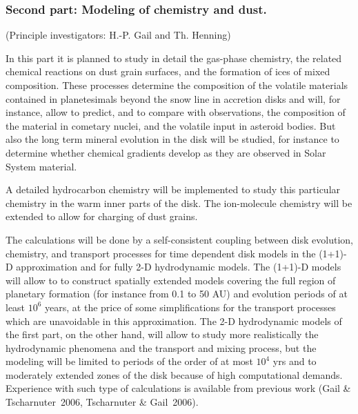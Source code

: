 \subsubsection{Second part: Modeling of chemistry and dust.}
(Principle investigators: H.-P. Gail and Th. Henning)

\noindent In this part it is planned to study in detail the gas-phase
chemistry, the related chemical reactions on dust grain surfaces,
and the formation of ices of mixed composition. These processes
determine the composition of the volatile materials contained in
planetesimals beyond the snow line in accretion disks and will,
for instance, allow to predict, and to compare with observations,
the composition of the material in cometary nuclei, and the
volatile input in asteroid bodies. But also the long term mineral
evolution in the disk will be studied, for instance to determine
whether chemical gradients develop as they are observed in Solar
System material.

A detailed hydrocarbon chemistry will be implemented to study this
particular chemistry in the warm inner parts of the disk. The
ion-molecule chemistry will be extended to allow for charging of
dust grains.

The calculations will be done by a self-consistent coupling
between disk evolution, chemistry, and transport processes for
time dependent disk models in the (1+1)-D approximation and for
fully 2-D hydrodynamic models. The (1+1)-D models will allow
to to construct spatially extended models covering the full
region of planetary formation (for instance from 0.1 to 50 AU)
and evolution periods of at least $10^6$ years, at the
price of some simplifications for the transport processes which
are unavoidable in this approximation. The 2-D hydrodynamic models
of the first part, on the other hand, will allow to study more
realistically the hydrodynamic phenomena and the transport and
mixing process, but the modeling will be limited to periods of the
order of at most $10^4$ yrs and to moderately extended zones of
the disk because of high computational demands. Experience with
such type of calculations is available from previous work
(Gail \& Tscharnuter~2006, Tscharnuter \& Gail~2006).

